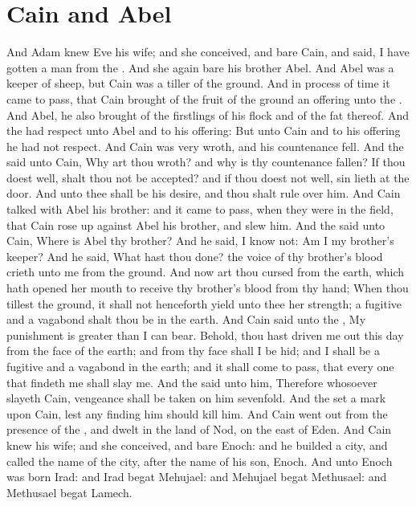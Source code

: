 \section*{Cain and Abel}
\begin{biblechapter} %
\verse And Adam knew Eve his wife; and she conceived, and bare Cain, and said, I have gotten a man from the \LORD.
\verse And she again bare his brother Abel. And Abel was a keeper of sheep, but Cain was a tiller of the ground.
\verse And in process of time it came to pass, that Cain brought of the fruit of the ground an offering unto the \LORD.
\verse And Abel, he also brought of the firstlings of his flock and of the fat thereof. And the \LORD had respect unto Abel and to his offering:
\verse But unto Cain and to his offering he had not respect. And Cain was very wroth, and his countenance fell.
\verse And the \LORD said unto Cain, Why art thou wroth? and why is thy countenance fallen?
\verse If thou doest well, shalt thou not be accepted? and if thou doest not well, sin lieth at the door. And unto thee shall be his desire, and thou shalt rule over him.
\verse And Cain talked with Abel his brother: and it came to pass, when they were in the field, that Cain rose up against Abel his brother, and slew him.
\verse And the \LORD said unto Cain, Where is Abel thy brother? And he said, I know not: Am I my brother's keeper?
\verse And he said, What hast thou done? the voice of thy brother's blood crieth unto me from the ground.
\verse And now art thou cursed from the earth, which hath opened her mouth to receive thy brother's blood from thy hand;
\verse When thou tillest the ground, it shall not henceforth yield unto thee her strength; a fugitive and a vagabond shalt thou be in the earth.
\verse And Cain said unto the \LORD, My punishment is greater than I can bear.
\verse Behold, thou hast driven me out this day from the face of the earth; and from thy face shall I be hid; and I shall be a fugitive and a vagabond in the earth; and it shall come to pass, that every one that findeth me shall slay me.
\verse And the \LORD said unto him, Therefore whosoever slayeth Cain, vengeance shall be taken on him sevenfold. And the \LORD set a mark upon Cain, lest any finding him should kill him.
\verse And Cain went out from the presence of the \LORD, and dwelt in the land of Nod, on the east of Eden.
\verse And Cain knew his wife; and she conceived, and bare Enoch: and he builded a city, and called the name of the city, after the name of his son, Enoch.
\verse And unto Enoch was born Irad: and Irad begat Mehujael: and Mehujael begat Methusael: and Methusael begat Lamech.

\end{biblechapter}
